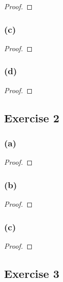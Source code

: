 \documentclass[14pt]{extarticle}
\begin{document}
\begin{proof}

\end{proof}

\subsubsection{(c)}

\begin{proof}

\end{proof}

\subsubsection{(d)}

\begin{proof}

\end{proof}

\subsection{Exercise 2}

\subsubsection{(a)}

\begin{proof}

\end{proof}

\subsubsection{(b)}

\begin{proof}

\end{proof}

\subsubsection{(c)}

\begin{proof}

\end{proof}

\subsection{Exercise 3}
\end{document}
